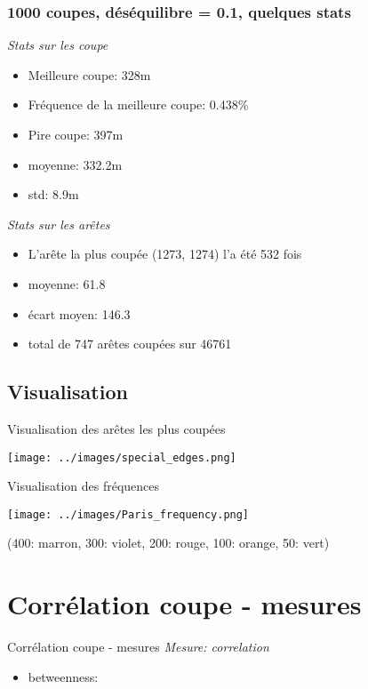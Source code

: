 \documentclass[aspectratio=169]{beamer}
\begin{document}
    \begin{frame}
        \frametitle{1000 coupes, déséquilibre = 0.1, quelques stats}
        \emph{Stats sur les coupe}
        \begin{itemize}
            \item Meilleure coupe: 328m
            \item Fréquence de la meilleure coupe: 0.438\%
            \item Pire coupe: 397m
            \item moyenne: 332.2m
            \item std: 8.9m
        \end{itemize}
        \emph{Stats sur les arêtes}
        \begin{itemize}
            \item L'arête la plus coupée (1273, 1274) l'a été 532 fois
            \item moyenne: 61.8
            \item écart moyen: 146.3
            \item total de 747 arêtes coupées sur 46761
        \end{itemize}
    \end{frame}

    \subsection{Visualisation}
    \begin{frame}{Visualisation des arêtes les plus coupées}
        \begin{center}
            \texttt{[image: ../images/special\_edges.png]}
        \end{center}
    \end{frame}

    \begin{frame}{Visualisation des fréquences}
    \begin{center}
        \texttt{[image: ../images/Paris\_frequency.png]}
    \end{center}
    (400: marron, 300: violet, 200: rouge, 100: orange, 50: vert)
    \end{frame}

    \section{Corrélation coupe - mesures}

    \begin{frame}{Corrélation coupe - mesures}
    \emph{Mesure: correlation}
    \begin{itemize}
        \item betweenness:  
    \end{itemize}
    \end{frame}
\end{document}
